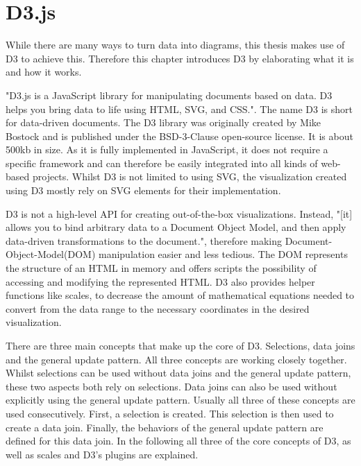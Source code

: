 \section{D3.js}

While there are many ways to turn data into diagrams, this thesis makes use of D3 to achieve this. Therefore this chapter introduces D3 by elaborating what it is and how it works.

"D3.js is a JavaScript library for manipulating documents based on data. D3 helps you bring data to life using HTML, SVG, and CSS."\cite{d3js}. The name D3 is short for data-driven documents. The D3 library was originally created by Mike Bostock and is published under the BSD-3-Clause open-source license. It is about 500kb in size. As it is fully implemented in JavaScript, it does not require a specific framework and can therefore be easily integrated into all kinds of web-based projects. Whilst D3 is not limited to using SVG, the visualization created using D3 mostly rely on SVG elements for their implementation.

D3 is not a high-level API for creating out-of-the-box visualizations. Instead, "[it] allows you to bind arbitrary data to a Document Object Model, and then apply data-driven transformations to the document."\cite{d3js}, therefore making Document-Object-Model(DOM) manipulation easier and less tedious. The DOM represents the structure of an HTML in memory and offers scripts the possibility of accessing and modifying the represented HTML. D3 also provides helper functions like scales, to decrease the amount of mathematical equations needed to convert from the data range to the necessary coordinates in the desired visualization.

There are three main concepts that make up the core of D3. Selections, data joins and the general update pattern. All three concepts are working closely together. Whilst selections can be used without data joins and the general update pattern, these two aspects both rely on selections. Data joins can also be used without explicitly using the general update pattern. Usually all three of these concepts are used consecutively. First, a selection is created. This selection is then used to create a data join. Finally, the behaviors of the general update pattern are defined for this data join.
In the following all three of the core concepts of D3, as well as scales and D3's plugins are explained.


